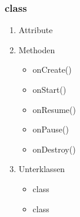 \documentclass[a4paper]{scrreprt}
\begin{document}
                \subsubsection{class }
                \begin{enumerate}
                        \item Attribute
                        \item Methoden
                            \begin{itemize}
                                \item onCreate()
                                \item onStart()
                                \item onResume()
                                \item onPause()
                                \item onDestroy()
                            \end{itemize}
                        \item Unterklassen
                            \begin{itemize}
                                \item class 
                                \item class 
                            \end{itemize}

                \end{enumerate}
\end{document}
